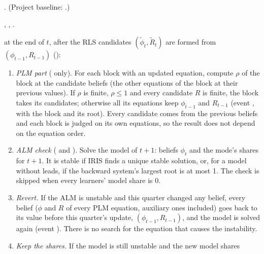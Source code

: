 \documentclass[11pt,a4paper]{article}
\DeclareRobustCommand{\codem}[1]{\texttt{\detokenize{#1}}}
\newenvironment{optspec}%
  {\begin{description}[style=sameline,leftmargin=2.7cm,labelwidth=2.5cm,font=\normalfont\itshape]}%
  {\end{description}}
\begin{document}
\subsubsection{\texorpdfstring{\codem{projection.facility}}{projection.facility}}\label{opt:projection-facility}
\begin{optspec}
  \item[Default] . (Project baseline: .)
  \item[Values] , , .
  \item[Math] at the end of $t$, after the RLS candidates $(\tilde\phi_t, \tilde R_t)$ are formed
        from $(\phi_{t-1}, R_{t-1})$ ():
        \begin{enumerate}[nosep,label=(\alph*)]
          \item \emph{PLM part} ( only). For each block with an updated
                equation, compute $\rho$ of the block at the candidate beliefs (the other
                equations of the block at their previous values). If $\rho$ is finite, $\rho\le 1$
                and every candidate $R$ is finite, the block takes its candidates; otherwise all
                its equations keep $\phi_{t-1}$ and $R_{t-1}$ (event , with the
                block and its root). Every candidate comes from the previous beliefs and each block
                is judged on its own equations, so the result does not depend on the equation
                order.
          \item \emph{ALM check} ( and ). Solve the model of $t+1$:
                beliefs $\phi_t$ and the mode's shares for $t+1$. It is stable if IRIS finds a
                unique stable solution, or, for a model without leads, if the backward system's
                largest root is at most 1. The check is skipped when every learners' model share
                is 0.
          \item \emph{Revert.} If the ALM is unstable and this quarter changed any belief, every
                belief ($\phi$ and $R$ of every PLM equation, auxiliary ones included) goes back to
                its value before this quarter's update, $(\phi_{t-1}, R_{t-1})$, and the model is
                solved again (event ). There is no search for the equation
                that causes the instability.
          \item \emph{Keep the shares.} If the model is still unstable and the new model shares

\end{enumerate}
\end{optspec}
\end{document}
